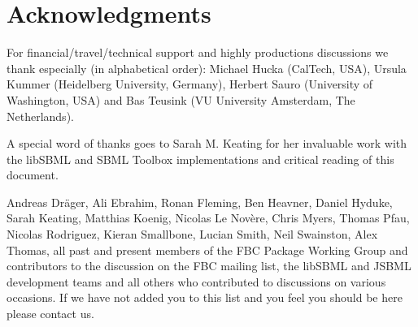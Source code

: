 
\section{Acknowledgments}


For financial/travel/technical support and highly productions discussions we thank especially (in alphabetical order): Michael Hucka (CalTech, USA), Ursula Kummer (Heidelberg University, Germany), Herbert Sauro (University of Washington, USA) and Bas Teusink (VU University Amsterdam, The Netherlands).

A special word of thanks goes to Sarah M. Keating for her invaluable work with the \textsf{libSBML} and \textsf{SBML Toolbox} implementations and critical reading of this document.

 Andreas Dr\"{a}ger, Ali Ebrahim, Ronan Fleming, Ben Heavner, Daniel Hyduke, Sarah Keating, Matthias Koenig, Nicolas Le Nov\`{e}re, Chris Myers, Thomas Pfau, Nicolas Rodriguez, Kieran Smallbone, Lucian Smith, Neil Swainston, Alex Thomas, all past and present members of the \textsf{FBC Package Working Group} and contributors to the discussion on the \textsf{FBC mailing list}, the libSBML and JSBML development teams and all others who contributed to discussions on various occasions. If we have not added you to this list and you feel you should be here please contact us.

